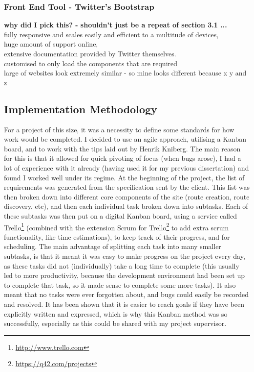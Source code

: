 \subsubsection{Front End Tool - Twitter's Bootstrap}
{\color{red} 
	\textbf{why did I pick this? - shouldn't just be a repeat of section 3.1 ...}\\
fully responsive and scales easily and efficient to a multitude of devices, \\
huge amount of support online, \\
extensive documentation provided by Twitter themselves. \\
customised to only load the components that are required\\
 large of websites look extremely similar - so mine looks different because x y and z
}

\newpage 
\subsection{Implementation Methodology}
For a project of this size, it was a necessity to define some standards for how work would be completed. I decided to use an agile approach, utilising a Kanban board, and to work with the tips laid out by Henrik Kniberg\cite{kniberg2007scrum}. The main reason for this is that it allowed for quick pivoting of focus (when bugs arose), I had a lot of experience with it already (having used it for my previous dissertation) and found I worked well under its regime. At the beginning of the project, the list of requirements was generated from the specification sent by the client. This list was then broken down into different core components of the site (route creation, route discovery, etc), and then each individual task broken down into subtasks. Each of these subtasks was then put on a digital Kanban board, using a service called Trello\footnote{\url{http://www.trello.com}} (combined with the extension Scrum for Trello\footnote{\url{https://q42.com/projects}} to add extra scrum functionality, like time estimations), to keep track of their progress, and for scheduling. The main advantage of splitting each task into many smaller subtasks, is that it meant it was easy to make progress on the project every day, as these tasks did not (individually) take a long time to complete (this usually led to more productivity, because the development environment had been set up to complete that task, so it made sense to complete some more tasks). It also meant that no tasks were ever forgotten about, and bugs could easily be recorded and resolved. It has been shown that it is easier to reach goals if they have been explicitly written and expressed\cite{wilson2008goal}, which is why this Kanban method was so successfully, especially as this could be shared with my project supervisor.

